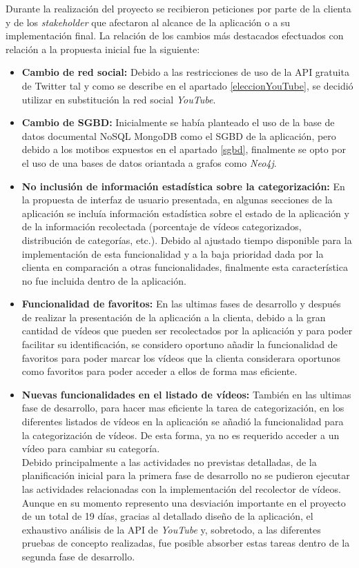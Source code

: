 \documentclass[11pt,a4paper]{article}
\begin{document}
Durante la realización del proyecto se recibieron peticiones por parte de la clienta y de los \textit{stakeholder} que afectaron al alcance de la aplicación o a su implementación final. La relación de los cambios más destacados efectuados con relación a la propuesta inicial fue la siguiente:
\begin{itemize}
\item \textbf{Cambio de red social:} Debido a las restricciones de uso de la API gratuita de Twitter tal y como se describe en el apartado \ref{eleccionYouTube}, se decidió utilizar en substitución la red social \textit{YouTube}.
\item \textbf{Cambio de SGBD:} Inicialmente se había planteado el uso de la base de datos documental NoSQL MongoDB como el SGBD de la aplicación, pero debido a los motibos expuestos en el apartado \ref{sgbd}, finalmente se opto por el uso de una bases de datos oriantada a grafos como \textit{Neo4j}.
\item \textbf{No inclusión de información estadística sobre la categorización:} En la propuesta de interfaz de usuario presentada, en algunas secciones de la aplicación se incluía información estadística sobre el estado de la aplicación y de la información recolectada (porcentaje de vídeos categorizados, distribución de categorías, etc.). Debido al ajustado tiempo disponible para la implementación de esta funcionalidad y a la baja prioridad dada por la clienta en comparación a otras funcionalidades, finalmente esta característica no fue incluida dentro de la aplicación.
\item \textbf{Funcionalidad de favoritos:} En las ultimas fases de desarrollo y después de realizar la presentación de la aplicación a la clienta, debido a la gran cantidad de vídeos que pueden ser recolectados por la aplicación y para poder facilitar su identificación, se considero oportuno añadir la funcionalidad de favoritos para poder marcar los vídeos que la clienta considerara oportunos como favoritos para poder acceder a ellos de forma mas eficiente.
\item \textbf{Nuevas funcionalidades en el listado de vídeos:} También en las ultimas fase de desarrollo, para hacer mas eficiente la tarea de categorización, en los diferentes listados de vídeos en la aplicación se añadió la funcionalidad para la categorización de vídeos. De esta forma, ya no es requerido acceder a un vídeo para cambiar su categoría. 
\\

Debido principalmente a las actividades no previstas detalladas, de la planificación inicial para la primera fase de desarrollo no se pudieron ejecutar las actividades relacionadas con la implementación del recolector de vídeos. Aunque en su momento represento una desviación importante en el proyecto de un total de 19 días, gracias al detallado diseño de la aplicación, el exhaustivo análisis de la API de \textit{YouTube} y, sobretodo, a las diferentes pruebas de concepto realizadas, fue posible absorber estas tareas dentro de la segunda fase de desarrollo. 
\\


\end{itemize}
\end{document}
